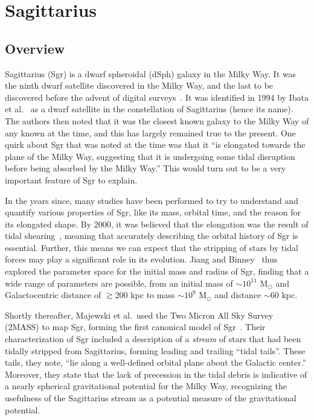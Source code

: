 \hypertarget{sagittarius}{%
\chapter{Sagittarius}\label{sagittarius}}

\hypertarget{overview}{%
\section{Overview}\label{overview}}

Sagittarius (Sgr) is a dwarf spheroidal (dSph) galaxy in the Milky Way. It was
the ninth dwarf satellite discovered in the Milky Way, and the last to be
discovered before the advent of digital surveys~\cite{simon_faintest_2019}. It
was identified in 1994 by Ibata et al.~\cite{ibata_dwarf_1994} as a dwarf
satellite in the constellation of Sagittarius (hence its name). The authors
then noted that it was the closest known galaxy to the Milky Way of any known
at the time, and this has largely remained true to the present. One quirk
about Sgr that was noted at the time was that it ``is elongated towards the
plane of the Milky Way, suggesting that it is undergoing some tidal disruption
before being absorbed by the Milky Way.'' This would turn out to be a very
important feature of Sgr to explain.

In the years since, many studies have been performed to try to understand and
quantify various properties of Sgr, like its mass, orbital time, and the
reason for its elongated shape. By 2000, it was believed that the elongation
was the result of tidal shearing~\cite{jiang_orbit_2000}, meaning that
accurately describing the orbital history of Sgr is essential. Further, this
means we can expect that the stripping of stars by tidal forces may play a
significant role in its evolution. Jiang and Binney~\cite{jiang_orbit_2000}
thus explored the parameter space for the initial mass and radius of Sgr,
finding that a wide range of parameters are possible, from an initial mass of
\(\sim 10^{11}\) M\(_\odot\) and Galactocentric distance of \(\gtrsim 200\)
kpc to mass \(\sim 10^9\) M\(_\odot\) and distance \(\sim 60\) kpc.

Shortly thereafter, Majewski et al.~used the Two Micron All Sky Survey (2MASS)
to map Sgr, forming the first canonical model of Sgr~\cite{majewski_two_2003}.
Their characterization of Sgr included a description of a \emph{stream} of
stars that had been tidally stripped from Sagittarius, forming leading and
trailing ``tidal tails''. These tails, they note, ``lie along a well-defined
orbital plane about the Galactic center.'' Moreover, they state that the lack
of precession in the tidal debris is indicative of a nearly spherical
gravitational potential for the Milky Way, recognizing the usefulness of the
Sagittarius stream as a potential measure of the gravitational potential. 

